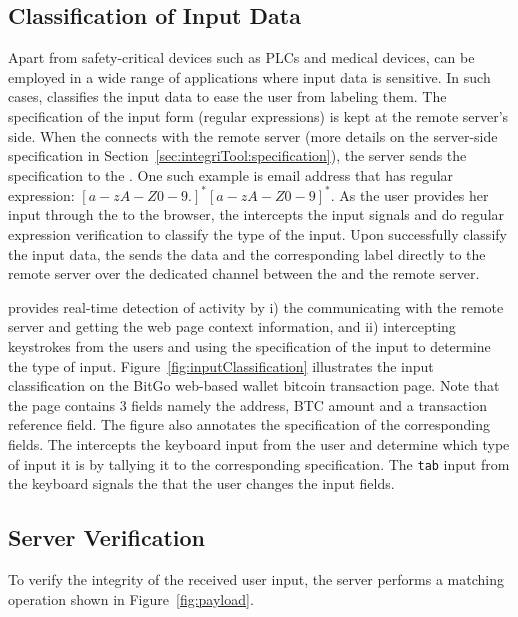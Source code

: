 \subsection{Classification of Input Data}

Apart from safety-critical devices such as PLCs and medical devices, \name can be employed in a wide range of applications where input data is sensitive. In such cases, \device classifies the input data to ease the user from labeling them. The specification of the input form (regular expressions) is kept at the remote server's side. When the \device connects with the remote server (more details on the server-side specification in Section~\ref{sec:integriTool:specification}), the server sends the specification to the \device. One such example is email address that has regular expression: $[a-zA-Z0-9.]^*[a-zA-Z0-9]^*$. As the user provides her input through the \device to the browser, the \device intercepts the input signals and do regular expression verification to classify the type of the input. Upon successfully classify the input data, the \device sends the data and the corresponding label directly to the remote server over the dedicated \tls channel between the \device and the remote server.

 \name provides real-time detection of activity by i) the \device communicating with the remote server and getting the web page context information, and ii) intercepting keystrokes from the users and using the specification of the input to determine the type of input. Figure~\ref{fig:inputClassification} illustrates the input classification on the BitGo web-based wallet bitcoin transaction page. Note that the page contains 3 fields namely the address, BTC amount and a transaction reference field. The figure also annotates the specification of the corresponding fields. The \device intercepts the keyboard input from the user and determine which type of input it is by tallying it to the corresponding specification. The \texttt{tab} input from the keyboard signals the \device that the user changes the input fields.  
\fi

\subsection{Server Verification}
\label{sec:integriKey:server} 

To verify the integrity of the received user input, the server performs a matching operation shown in Figure~\ref{fig:payload}. 

